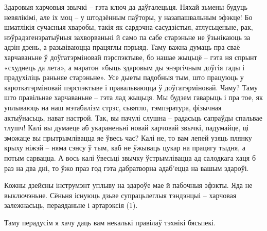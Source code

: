 Здаровыя харчовыя звычкі – гэта ключ да даўгалецьця. Няхай зьмены будуць невялікімі, але іх моц – у штодзённым паўторы, у назапашвальным эфэкце! Бо шматлікія сучасныя хваробы, такія як сардэчна-сасудзістыя, атлусьценьне, рак, нэўрадэгенэратыўныя захворваньні й само па сабе старэньне не ўзьнікаюць за адзін дзень, а разьвіваюцца працяглы пэрыяд. Таму важна думаць пра сваё харчаваньне ў доўгатэрміновай пэрспэктыве, бо нашае жыцьцё – гэта ня спрынт «схуднець да лета», а маратон «быць здаровым ды энэргічным доўгія гады і прадухіліць раньняе старэньне». Усе дыеты падобныя тым, што працуюць у кароткатэрміновай пэрспэктыве і правальваюцца ў доўгатэрміновай. Чаму? Таму што правільнае харчаваньне – гэта лад жыцьця. Мы будзем гаварыць і пра тое, як уплываюць на наш мэтабалізм стрэс, сьвятло, тэмпэратура, фізычная актыўнасьць, нават настрой. Так, вы пачулі слушна – радасьць сапраўды спальвае тлушч! Калі вы думаеце аб укараненьні новай харчовай звычкі, падумайце, ці зможаце вы прытрымлівацца яе ўвесь час? Калі не, то вам лепей узяць плянку крыху ніжэй – няма сэнсу ў тым, каб не ўжываць цукар на працягу тыдня, а потым сарвацца. А вось калі ўвесьці звычку ўстрымлівацца ад салодкага хаця б раз на два дні, то ўжо праз год гэта дабратворна адаб'ецца на вашым здароўі.

Кожны дзейсны інструмэнт уплыву на здароўе мае й пабочныя эфэкты. Яда не выключэньне. Сёньня існуюць дзьве супрацьлеглыя тэндэнцыі – харчовая залежнасьць, пераяданьне і артарэксія (1). 

Таму перадусім я хачу даць вам некалькі правілаў тэхнікі бясьпекі.

